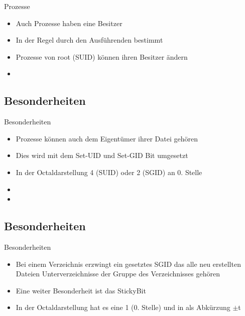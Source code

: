 \documentclass[aspectratio=43]{beamer}
\begin{document}
\begin{frame} 
	\begin{block}{Prozesse}
	\begin{itemize}
	\item Auch Prozesse haben eine Besitzer
	\item In der Regel durch den Ausführenden bestimmt
	\item Prozesse von root (SUID) können ihren Besitzer ändern
	\end{itemize}
	\end{block}
	\begin{exampleblock}{}
	\begin{itemize}
	\item {}
	\end{itemize}
	\end{exampleblock}
\end{frame}

\begin{frame} 

\subsection{Besonderheiten}
	\begin{block}{Besonderheiten}
	\begin{itemize}
	\item Prozesse können auch dem Eigentümer ihrer Datei gehören
	\item Dies wird mit dem Set-UID und Set-GID Bit umgesetzt
	\item In der Octaldarstellung 4 (SUID) oder 2 (SGID) an 0. Stelle
	\end{itemize}
	\end{block}
	\begin{exampleblock}{}
	\begin{itemize}
	\item {}
	\item {}
	\end{itemize}
	\end{exampleblock}
\end{frame}


\begin{frame} 

\subsection{Besonderheiten}
	\begin{block}{Besonderheiten}
	\begin{itemize}
	\item Bei einem Verzeichnis erzwingt ein gesetztes SGID das alle neu erstellten Dateien Unterverzeichnisse  der Gruppe des Verzeichnisses gehören
	\item Eine weiter Besonderheit ist das StickyBit
	\item In der Octaldarstellung hat es eine 1 (0. Stelle) und in als Abkürzung  $\pm$t
	\end{itemize}
	\end{block}

\end{frame}
\end{document}
